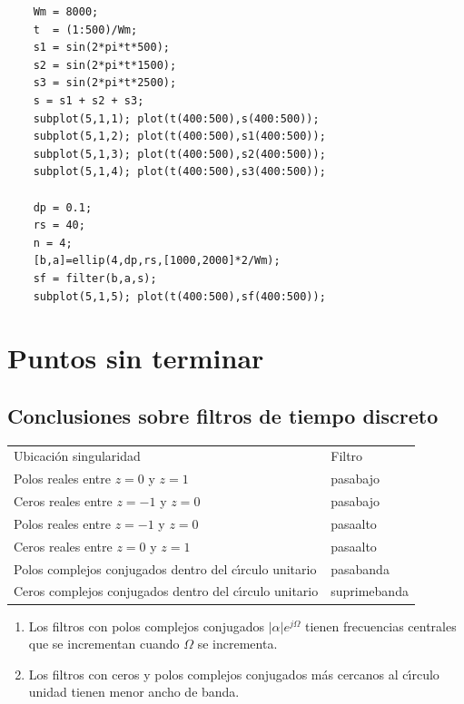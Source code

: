 \begin{verbatim}
	Wm = 8000;
	t  = (1:500)/Wm;
	s1 = sin(2*pi*t*500);
	s2 = sin(2*pi*t*1500);
	s3 = sin(2*pi*t*2500);
	s = s1 + s2 + s3;
	subplot(5,1,1); plot(t(400:500),s(400:500));
	subplot(5,1,2); plot(t(400:500),s1(400:500));
	subplot(5,1,3); plot(t(400:500),s2(400:500));
	subplot(5,1,4); plot(t(400:500),s3(400:500));
	
	dp = 0.1;
	rs = 40;
	n = 4;
	[b,a]=ellip(4,dp,rs,[1000,2000]*2/Wm);
	sf = filter(b,a,s);
	subplot(5,1,5); plot(t(400:500),sf(400:500));
\end{verbatim}


\chapter{Puntos sin terminar}

\section{Conclusiones sobre filtros de tiempo discreto}

\begin{tabular}{ll}
        Ubicaci\'{o}n singularidad                                      & Filtro                        \\
        Polos reales entre $z=0$ y $z=1$                                & pasabajo                      \\ 
        Ceros reales entre $z=-1$ y $z=0$                               & pasabajo                      \\ 
        Polos reales entre $z=-1$ y $z=0$                               & pasaalto                      \\ 
        Ceros reales entre $z=0$ y $z=1$                                & pasaalto                      \\ 
        Polos complejos conjugados dentro del c\'{\i}rculo unitario     & pasabanda                     \\ 
        Ceros complejos conjugados dentro del c\'{\i}rculo unitario     & suprimebanda 
\end{tabular}

\begin{enumerate}
\item  Los filtros con polos complejos conjugados $\left| \alpha \right| e^{j\Omega }$ tienen 
frecuencias centrales que se incrementan cuando $\Omega $ se incrementa.

\item  Los filtros con ceros y polos complejos conjugados m\'{a}s cercanos al c\'{\i}rculo unidad 
tienen menor ancho de banda.
\end{enumerate}

